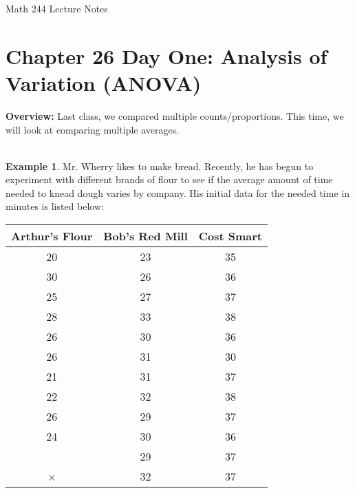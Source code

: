 \documentclass[12pt]{amsart}
\date{}
\theoremstyle{definition}
\newtheorem{ex}{Example}
\begin{document}
\newcommand{\ph}{\phantom}
\newcommand{\ds}{\displaystyle}

\renewcommand{\emph}{\textbf}
\onehalfspace


\fancyhf{}   %
\renewcommand{\headrulewidth}{0.4pt} %
\fancyfootoffset[LE,LO]{0in}        %
\renewcommand{\footrulewidth}{0.4pt} %




\begin{center}

	\larger[3]	Math 244 Lecture Notes \smaller[3]		\\[22pt]

\end{center}

\section*{Chapter 26 Day One: Analysis of Variation (ANOVA)}




 \textbf{Overview:} Last class, we compared multiple counts/proportions. This time, we will look at comparing multiple averages.\\
 ~\\
 \begin{ex} 
  Mr. Wherry likes to make bread. Recently, he has begun to experiment with different brands of flour to see if the average amount of time needed to knead dough varies by company. His initial data for the needed time in minutes is listed below:
 ~\\ 
  \begin{center}
\begin{tabular}{c|c|c}
Arthur's Flour & Bob's Red Mill & Cost Smart\\\hline
20 & 23 & 35\\
30 & 26 & 36\\
25 & 27 & 37\\
28 & 33 & 38\\
26 & 30 & 36\\
26 & 31 & 30\\
21 & 31 & 37\\
22 & 32 & 38\\
26 & 29 & 37\\
24 & 30 & 36\\
  & 29 & 37\\
× & 32 & 37
  \end{tabular}
  \end{center}
 \end{ex}
\end{document}
